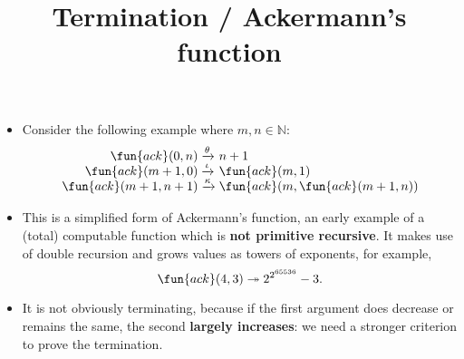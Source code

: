 \documentclass[wide]{slides}
\begin{document}
\begin{slide}
  \title{Termination / Ackermann's function}

  \begin{itemize}

    \item Consider the following example where \(m,n \in \mathbb{N}\):
      \begin{equation*}
        \begin{array}{@{}r@{\;}l@{\;}l@{}}
          \fun{ack}(0,n)     & \xrightarrow{\theta} & n+1\\
          \fun{ack}(m+1,0)   & \xrightarrow{\smash{\iota}}  &
          \fun{ack}(m,1)\\
          \fun{ack}(m+1,n+1) & \xrightarrow{\smash{\kappa}}
          & \fun{ack}(m,\fun{ack}(m+1,n))
        \end{array}
      \end{equation*}

    \item This is a simplified form of Ackermann's function, an early
      example of a (total) computable function which is \textbf{not
        primitive recursive}. It makes use of double recursion and
      grows values as towers of exponents, for example,
      \[\fun{ack}(4,3) \twoheadrightarrow 2^{2^{65536}} - 3.\]

    \item It is not obviously terminating, because if the first
      argument does decrease or remains the same, the second
      \textbf{largely increases}: we need a stronger criterion to
      prove the termination.

  \end{itemize}

\end{slide}
\end{document}
